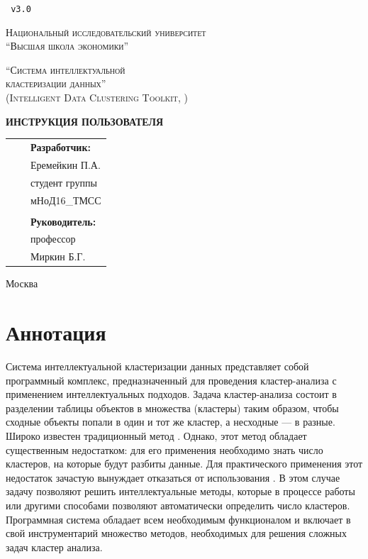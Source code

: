 \documentclass[12pt,tikz]{instruction}
\begin{document}
 
\begin{titlepage}
	\centering	
	\texttt { v3.0}

	{\scshape\small Национальный исследовательский университет \\
		``Высшая школа экономики'' \par}
	\vspace{2cm}
	{\scshape\Large ``Система интеллектуальной \\кластеризации данных'' \\
		(Intelligent Data Clustering Toolkit, \SysName)\par}
	\vspace{1.5cm}
	{\Huge\bfseries ИНСТРУКЦИЯ ПОЛЬЗОВАТЕЛЯ\par}
	\vspace{2cm}
	\vfill
	\begin{center}
		\begin{tabular}{  p{7cm}  p{4cm} p{5cm}  } 
			& & \textbf{Разработчик:}\\ 
			& & Еремейкин П.А. \\ 
			& & студент группы \\
			& & мНоД16\_ТМСС\\
			& & \\
			& & \textbf{Руководитель: }\\
			& & профессор\\
			& & Миркин Б.Г.\\
		\end{tabular}
	\end{center}
	\vfill
	{Москва \the\year\par}
\end{titlepage}

\section*{Аннотация}
Система интеллектуальной кластеризации данных \SysName представляет собой программный комплекс, предназначенный для проведения кластер-анализа с применением интеллектуальных подходов. Задача кластер-анализа состоит в разделении таблицы объектов в множества (кластеры) таким образом, чтобы сходные объекты попали в один и тот же кластер, а несходные --- в разные. Широко известен традиционный метод \kmeans. Однако, этот метод обладает существенным недостатком: для его применения необходимо знать число кластеров, на которые будут разбиты данные. Для практического применения этот недостаток зачастую вынуждает отказаться от использования \kmeans. В этом случае задачу позволяют решить интеллектуальные методы, которые в процессе работы или другими способами позволяют автоматически определить число кластеров. Программная система \SysName обладает всем необходимым функционалом и включает в свой инструментарий множество методов, необходимых для решения сложных задач кластер анализа.
\newpage
	
\end{document}

